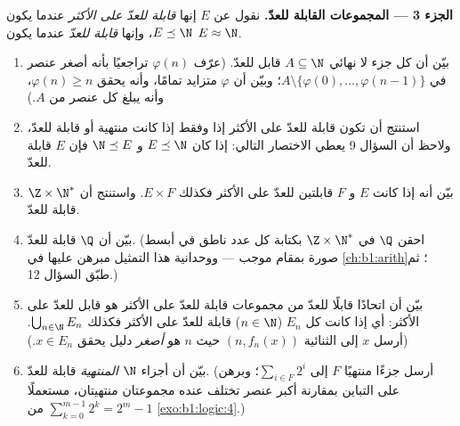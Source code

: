 \begin{problem}
\medskip
\noindent\textbf{الجزء 3 --- المجموعات القابلة للعدّ.} نقول عن
 $E$ إنها \emph{قابلة للعدّ على الأكثر} عندما يكون
$E \preceq \N$، وإنها \emph{قابلة للعدّ} عندما يكون $E \approx \N$.
\begin{enumerate}[resume]
  \item بيّن أن كل جزء لا نهائي $A \subseteq \N$ قابل للعدّ.
        (عرّف $\varphi(n)$ تراجعيًا بأنه أصغر عنصر في
        $A \setminus \{\varphi(0), \dots,
        \varphi(n-1)\}$؛ وبيّن أن $\varphi$ متزايد تمامًا، وأنه
        يحقق $\varphi(n) \geq n$، وأنه يبلغ كل عنصر من $A$.)
  \item استنتج أن  تكون قابلة للعدّ على الأكثر إذا وفقط إذا
        كانت منتهية أو قابلة للعدّ، ولاحظ أن السؤال 9 يعطي
        الاختصار التالي: إذا كان $E \preceq \N$ و $\N \preceq E$
        فإن $E$ قابلة للعدّ.
  \item بيّن أنه إذا كانت $E$ و $F$ قابلتين للعدّ على الأكثر
        فكذلك $E
        \times F$. واستنتج أن $\Z \times \N^*$ قابلة للعدّ.
  \item بيّن أن $\Q$ قابلة للعدّ. (احقن $\Q$ في $\Z \times
        \N^*$ بكتابة كل عدد ناطق في أبسط صورة بمقام موجب --- ووحدانية
        هذا التمثيل مبرهن عليها في \cref{ch:b1:arith}؛ ثم طبّق السؤال 12.)
  \item بيّن أن اتحادًا قابلًا للعدّ من مجموعات قابلة للعدّ على
        الأكثر هو قابل للعدّ على الأكثر: أي إذا كانت كل $E_n$
        ($n \in \N$) قابلة للعدّ على الأكثر فكذلك $\bigcup_{n \in \N} E_n$. (أرسل $x$ إلى
        الثنائية $(n, f_n(x))$ حيث $n$ هو \emph{أصغر} دليل يحقق
        $x \in E_n$.)
  \item بيّن أن  أجزاء $\N$ \emph{المنتهية} قابلة للعدّ.
        (أرسل جزءًا منتهيًا $F$ إلى $\sum_{i \in F} 2^i$؛ وبرهن
        على التباين بمقارنة أكبر عنصر تختلف عنده مجموعتان
        منتهيتان، مستعملًا $\sum_{k=0}^{m-1} 2^k = 2^m - 1$
        من \cref{exo:b1:logic:4}.)
\end{enumerate}


\end{problem}
